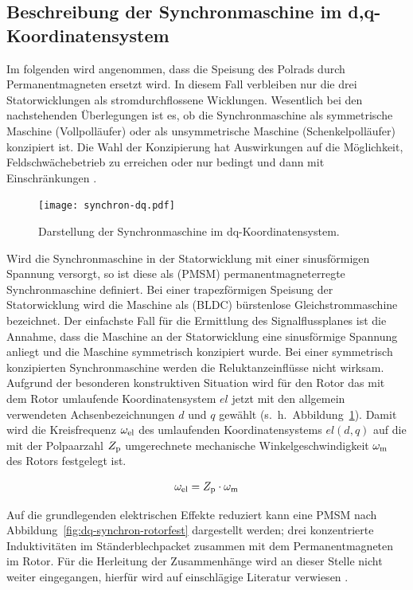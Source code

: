 \subsection{Beschreibung der Synchronmaschine im d,q-Koordinatensystem}\label{sec:synchron-dq}

Im folgenden wird angenommen, dass die Speisung des Polrads durch Permanentmagneten ersetzt wird.
In diesem Fall verbleiben nur die drei Statorwicklungen als stromdurchflossene Wicklungen.
Wesentlich bei den nachstehenden Überlegungen ist es, ob die Synchronmaschine als symmetrische Maschine (Vollpolläufer) oder als unsymmetrische Maschine (Schenkelpolläufer) konzipiert ist.
Die Wahl der Konzipierung hat Auswirkungen auf die Möglichkeit, Feldschwächebetrieb zu erreichen oder nur bedingt und dann mit Einschränkungen \autocite[S.~291]{schroder2000}.

\begin{figure}[!htb]
\centering
\texttt{[image: synchron-dq.pdf]}
\label{fig:synchron-dq}
\caption{Darstellung der Synchronmaschine im dq-Koordinatensystem.}
\end{figure}

Wird die Synchronmaschine in der Statorwicklung mit einer sinusförmigen Spannung versorgt, so ist diese als (PMSM) permanentmagneterregte Synchronmaschine definiert.
Bei einer trapezförmigen Speisung der Statorwicklung wird die Maschine als (BLDC) bürstenlose Gleichstrommaschine bezeichnet.
Der einfachste Fall für die Ermittlung des Signalflussplanes ist die Annahme, dass die Maschine an der Statorwicklung eine sinusförmige Spannung anliegt und die Maschine symmetrisch konzipiert wurde.
Bei einer symmetrisch konzipierten Synchronmaschine werden die Reluktanzeinflüsse nicht wirksam.
Aufgrund der besonderen konstruktiven Situation wird für den Rotor das mit dem Rotor umlaufende Koordinatensystem $el$ jetzt mit den allgemein verwendeten Achsenbezeichnungen $d$ und $q$ gewählt (s.~h.~Abbildung~\ref{fig:synchron-dq}).
Damit wird die Kreisfrequenz $\omega_{\mathrm{el}}$ des umlaufenden Koordinatensystems $el(d, q)$ auf die mit der Polpaarzahl $Z_{\mathrm{p}}$ umgerechnete mechanische Winkelgeschwindigkeit $\omega_{\mathrm{m}}$ des Rotors festgelegt ist.

\begin{align}
\omega_{\mathrm{el}} = Z_{\mathrm{p}}\cdot\omega_{\mathrm{m}}
\end{align}

Auf die grundlegenden elektrischen Effekte reduziert kann eine PMSM nach Abbildung~\ref{fig:dq-synchron-rotorfest} dargestellt werden; drei konzentrierte Induktivitäten im Ständerblechpacket zusammen mit dem Permanentmagneten im Rotor.
Für die Herleitung der Zusammenhänge wird an dieser Stelle nicht weiter eingegangen, hierfür wird auf einschlägige Literatur verwiesen \autocites{mullerI2005}{fischer2009}{schroder2000}{kremser2004}.

